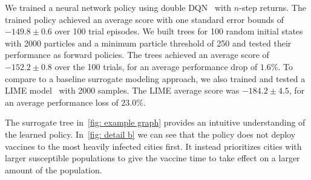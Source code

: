 \documentclass[letterpaper]{article} %
\begin{document}
We trained a neural network policy using double DQN~\cite{hasselt2010} with $n$-step returns.
The trained policy achieved an average score with one standard error bounds of $-149.8 \pm 0.6$ over 100 trial episodes.
We built trees for 100 random initial states with 2000 particles and a minimum particle threshold of 250 and tested their performance as forward policies. 
The trees achieved an average score of $-152.2 \pm 0.8$ over the 100 trials, for an average performance drop of $1.6 \%$. 
To compare to a baseline surrogate modeling approach, we also trained and tested a LIME model~\cite{ribeiro2016} with 2000 samples.
The LIME average score was $-184.2 \pm 4.5$, for an average performance loss of $23.0 \%$.

The surrogate tree in~\cref{fig: example graph} provides an intuitive understanding of the learned policy. 
In~\cref{fig: detail b} we can see that the policy does not deploy vaccines to the most heavily infected cities first. 
It instead prioritizes cities with larger susceptible populations to give the vaccine time to take effect on a larger amount of the population. 
\end{document}
